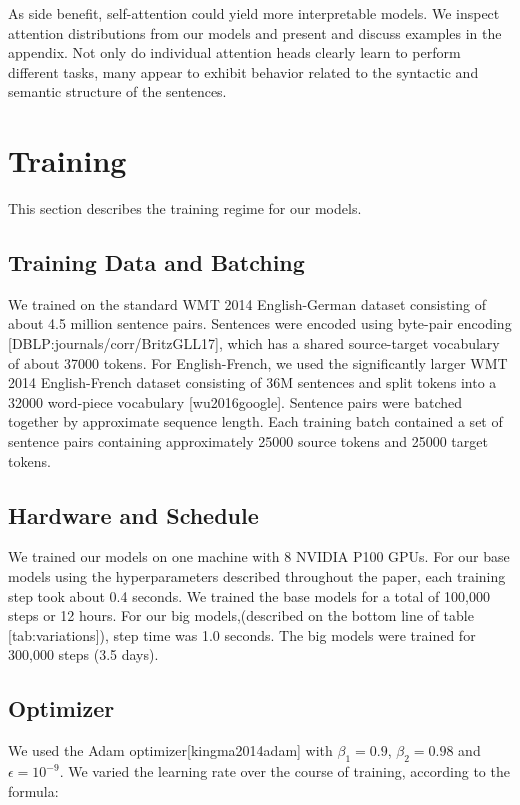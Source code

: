 \documentclass[11pt,a4paper]{article}
\begin{document}
As side benefit, self-attention could yield more interpretable models. We inspect attention distributions from our models and present and discuss examples in the appendix. Not only do individual attention heads clearly learn to perform different tasks, many appear to exhibit behavior related to the syntactic and semantic structure of the sentences.

\section{Training}

This section describes the training regime for our models.

\subsection{Training Data and Batching}

We trained on the standard WMT 2014 English-German dataset consisting of about 4.5 million sentence pairs.  Sentences were encoded using byte-pair encoding [DBLP:journals/corr/BritzGLL17], which has a shared source-target vocabulary of about 37000 tokens. For English-French, we used the significantly larger WMT 2014 English-French dataset consisting of 36M sentences and split tokens into a 32000 word-piece vocabulary [wu2016google].  Sentence pairs were batched together by approximate sequence length.  Each training batch contained a set of sentence pairs containing approximately 25000 source tokens and 25000 target tokens.

\subsection{Hardware and Schedule}

We trained our models on one machine with 8 NVIDIA P100 GPUs.  For our base models using the hyperparameters described throughout the paper, each training step took about 0.4 seconds.  We trained the base models for a total of 100,000 steps or 12 hours.  For our big models,(described on the bottom line of table [tab:variations]), step time was 1.0 seconds.  The big models were trained for 300,000 steps (3.5 days).

\subsection{Optimizer}

We used the Adam optimizer[kingma2014adam] with $\beta_1=0.9$, $\beta_2=0.98$ and $\epsilon=10^{-9}$.  We varied the learning rate over the course of training, according to the formula:
\end{document}
